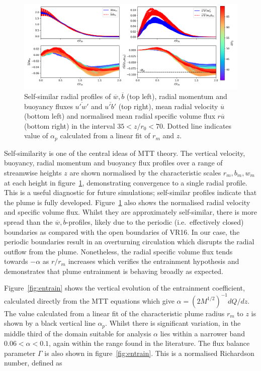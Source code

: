\documentclass[a4paper]{article}
\begin{document}
\begin{figure}
	\centering
	\includegraphics[width=\textwidth]{mvr/fig23}
	\caption{Self-similar radial profiles of $\overline{w}, \overline{b}$ (top left), radial momentum and
		buoyancy fluxes $\overline{u'w'}$ and $\overline{u'b'}$ (top right), mean radial velocity
		$\overline{u}$ (bottom left) and normalised mean radial specific volume flux $r\overline{u}$ (bottom
		right) in the interval $35 < z/r_0 < 70$. Dotted line indicates value of $\alpha_p$ calculated from a
		linear fit of $r_m$ and $z$.}
	\label{fig:selfsimilarradial}
\end{figure}

Self-similarity is one of the central ideas of MTT theory. The vertical velocity, buoyancy, radial momentum and
buoyancy flux profiles over a range of streamwise heights $z$ are shown normalised by the characteristic
scales $r_m, b_m, w_m$ at each height in figure~\ref{fig:selfsimilarradial}, demonstrating convergence to a
single radial profile. This is a useful diagnostic for future simulations; self-similar profiles indicate
that the plume is fully developed. Figure~\ref{fig:selfsimilarradial} also shows the normalised radial
velocity and specific volume flux. Whilst they are approximately self-similar, there is more spread than the
$\overline{w}, \overline{b}$-profiles, likely due to the periodic (i.e.\ effectively closed) boundaries as
compared with the open boundaries of VR16. In our case, the periodic boundaries result in an overturning
circulation which disrupts the radial outflow from the plume. Nonetheless, the radial specific volume flux
tends towards $-\alpha$ as $r/r_m$ increases which verifies the entrainment hypothesis and demonstrates that
plume entrainment is behaving broadly as expected. 

Figure~\ref{fig:entrain} shows the vertical evolution of the entrainment coefficient, calculated directly from
the MTT equations which give $\alpha = (2M^{1/2})^{-1}dQ/dz$. The value calculated from a linear fit of the
characteristic plume radius $r_m$ to $z$ is shown by a black vertical line $\alpha_p$. Whilst there is
significant variation, in the middle third of the domain suitable for analysis $\alpha$ lies within a narrower
band $0.06 < \alpha < 0.1$, again within the range found in the literature. The flux balance parameter
$\Gamma$ is also shown in figure~\ref{fig:entrain}. This is a normalised Richardson number, defined as
\end{document}
